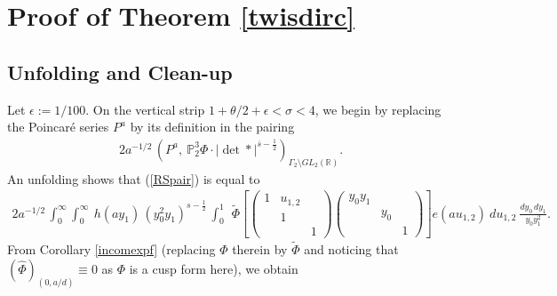 \documentclass[11pt,reqno]{amsart}
\theoremstyle{definition}
\theoremstyle{definition}
\theoremstyle{remark}
\newcommand{\R}{\ensuremath{\mathbb{R}}}
\numberwithin{equation}{section}
\begin{document}
 

 



 





\section{Proof of Theorem \ref{twisdirc}}\label{twist}


 
 
 	\subsection{Unfolding and Clean-up}\label{inisect}
 	Let $\epsilon:= 1/100$.  On the vertical strip $  1+\theta/2 +\epsilon< \sigma < 4$, we begin by replacing the Poincar\'{e} series $P^{a}$ by its definition in the pairing
 \begin{align}\label{RSpair}
 	 2a^{-1/2}  \, \left(P^a, \ \mathbb{P}_{2}^{3} \Phi\cdot  |\det *|^{\overline{s}-\frac{1}{2}}\right)_{\Gamma_{2}\setminus GL_{2}(\R)}. 
 \end{align}
An unfolding shows that (\ref{RSpair}) is equal to 
  \begin{align}
	 2a^{-1/2}\, \int_{0}^{\infty}  \int_{0}^{\infty} \  h(ay_{1})\, (y_{0}^2y_{1})^{s-\frac{1}{2}} \,   \int_{0}^{1} \hspace{5pt}   \widetilde{\Phi}\left[
	\begin{pmatrix}
		1 & u_{1,2} &  \\
		& 1          & \\
		&             & 1
	\end{pmatrix} 
	\begin{pmatrix}
		y_{0}y_{1} &             &  \\
		& y_{0}    &   \\
		&             & 1
	\end{pmatrix}\right] e(au_{1,2}) \ du_{1,2} \ \frac{dy_{0}\, dy_{1}}{y_{0}y_{1}^2}. \label{alunf}
 \end{align}
From Corollary \ref{incomexpf} (replacing $\Phi$ therein by $\widetilde{\Phi}$ and noticing that   $(\widehat{\Phi})_{(0,a/d)} \equiv 0$ as $\Phi$ is a cusp form here), we obtain
\end{document}

